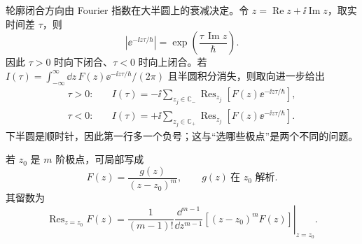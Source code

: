 轮廓闭合方向由 Fourier 指数在大半圆上的衰减决定。令 $z=\operatorname{Re}z+\ii\operatorname{Im}z$，取实时间差 $\tau$，则
\begin{equation}
 \boxed{
 \left|\ee^{-\ii z\tau/\hbar}\right|
 =\exp\!\left(\frac{\tau\,\operatorname{Im}z}{\hbar}\right).}
 \label{eq:jordan-exponential-r13}
\end{equation}
因此 $\tau>0$ 时向下闭合、$\tau<0$ 时向上闭合。若
$I(\tau)=\int_{-\infty}^{\infty}\dd z\,F(z)\ee^{-\ii z\tau/\hbar}/(2\pi)$
且半圆积分消失，则取向进一步给出
\begin{equation}
 \boxed{
 \begin{aligned}
 \tau>0:&\quad
 I(\tau)=-\ii\sum_{z_j\in\mathbb C_-}
 \operatorname{Res}_{z_j}[F(z)\ee^{-\ii z\tau/\hbar}],\\
 \tau<0:&\quad
 I(\tau)=+\ii\sum_{z_j\in\mathbb C_+}
 \operatorname{Res}_{z_j}[F(z)\ee^{-\ii z\tau/\hbar}].
 \end{aligned}}
 \label{eq:contour-orientation-residue-dp68}
\end{equation}
下半圆是顺时针，因此第一行多一个负号；这与“选哪些极点”是两个不同的问题。

若 $z_0$ 是 $m$ 阶极点，可局部写成
\begin{equation}
 \boxed{F(z)=\frac{g(z)}{(z-z_0)^m},\qquad g(z)\ \text{在 }z_0\text{ 解析}.}
 \label{eq:higher-pole-local-form-dp68}
\end{equation}
其留数为
\begin{equation}
 \boxed{
 \operatorname{Res}_{z=z_0}F(z)
 =\frac1{(m-1)!}
 \left.\frac{\dd^{m-1}}{\dd z^{m-1}}
 [(z-z_0)^mF(z)]\right|_{z=z_0}.}
 \label{eq:higher-pole-residue-dp68}
\end{equation}
